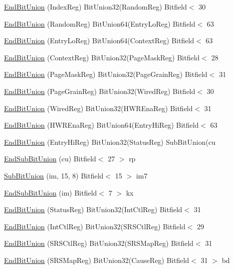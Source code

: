 \begin{DoxyCompactItemize}
\hyperlink{namespaceMipsISA_acdac2835e979782dfb5f4dedb07cebf6}{EndBitUnion} (IndexReg) BitUnion32(RandomReg) Bitfield$<$ 30
\item 
\hyperlink{namespaceMipsISA_a08a917e4a5520bc6b8708a50d79fc5e3}{EndBitUnion} (RandomReg) BitUnion64(EntryLoReg) Bitfield$<$ 63
\item 
\hyperlink{namespaceMipsISA_a2f83cac203226d978f94ceadc0f1fd88}{EndBitUnion} (EntryLoReg) BitUnion64(ContextReg) Bitfield$<$ 63
\item 
\hyperlink{namespaceMipsISA_affe34aeb9561de969472b55e2b0d5e0d}{EndBitUnion} (ContextReg) BitUnion32(PageMaskReg) Bitfield$<$ 28
\item 
\hyperlink{namespaceMipsISA_ab98e8b6b2a57e34bb361953a3b7f2000}{EndBitUnion} (PageMaskReg) BitUnion32(PageGrainReg) Bitfield$<$ 31
\item 
\hyperlink{namespaceMipsISA_ac14ccf4312f06938b6a25b4c6d1007be}{EndBitUnion} (PageGrainReg) BitUnion32(WiredReg) Bitfield$<$ 30
\item 
\hyperlink{namespaceMipsISA_ae6ae1f832215eb212edd341da19bfd74}{EndBitUnion} (WiredReg) BitUnion32(HWREnaReg) Bitfield$<$ 31
\item 
\hyperlink{namespaceMipsISA_adb415f6d2fa6029a6566a4bfcdb28cd4}{EndBitUnion} (HWREnaReg) BitUnion64(EntryHiReg) Bitfield$<$ 63
\item 
\hyperlink{namespaceMipsISA_a38f6c3f5c682d3b02ede775e3bff960f}{EndBitUnion} (EntryHiReg) BitUnion32(StatusReg) SubBitUnion(cu
\item 
\hyperlink{namespaceMipsISA_ab60686612b9e6fa8a4e99524f00655e0}{EndSubBitUnion} (cu) Bitfield$<$ 27 $>$ rp
\item 
\hyperlink{namespaceMipsISA_ab47da88f01b42dd221472b82e3ad0509}{SubBitUnion} (im, 15, 8) Bitfield$<$ 15 $>$ im7
\item 
\hyperlink{namespaceMipsISA_ac2fda487f43a314ab9a0da3bf8de9fb8}{EndSubBitUnion} (im) Bitfield$<$ 7 $>$ kx
\item 
\hyperlink{namespaceMipsISA_a2c66e89106e52623e57049523e1c9d6e}{EndBitUnion} (StatusReg) BitUnion32(IntCtlReg) Bitfield$<$ 31
\item 
\hyperlink{namespaceMipsISA_adae0c4656edafa9a1a60ea6f8623602b}{EndBitUnion} (IntCtlReg) BitUnion32(SRSCtlReg) Bitfield$<$ 29
\item 
\hyperlink{namespaceMipsISA_ac8ad39b298f45f7a6c0199e74940fd72}{EndBitUnion} (SRSCtlReg) BitUnion32(SRSMapReg) Bitfield$<$ 31
\item 
\hyperlink{namespaceMipsISA_a8197bb167f73b2ba92a556b54d35c247}{EndBitUnion} (SRSMapReg) BitUnion32(CauseReg) Bitfield$<$ 31 $>$ bd

\end{DoxyCompactItemize}

